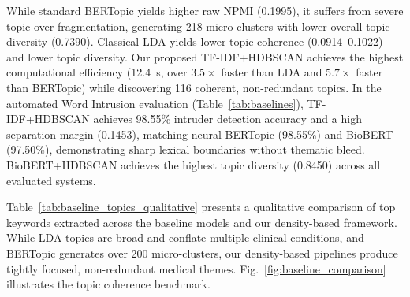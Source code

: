 \documentclass[a4paper,10pt,conference]{IEEEtran}
\begin{document}
While standard BERTopic yields higher raw NPMI (0.1995), it suffers from severe topic over-fragmentation, generating 218 micro-clusters with lower overall topic diversity (0.7390). Classical LDA yields lower topic coherence (0.0914--0.1022) and lower topic diversity. Our proposed TF-IDF+HDBSCAN achieves the highest computational efficiency (12.4~s, over $3.5\times$ faster than LDA and $5.7\times$ faster than BERTopic) while discovering 116 coherent, non-redundant topics. In the automated Word Intrusion evaluation (Table~\ref{tab:baselines}), TF-IDF+HDBSCAN achieves 98.55\% intruder detection accuracy and a high separation margin (0.1453), matching neural BERTopic (98.55\%) and BioBERT (97.50\%), demonstrating sharp lexical boundaries without thematic bleed. BioBERT+HDBSCAN achieves the highest topic diversity (0.8450) across all evaluated systems.

\begin{table}[t]
\centering
\caption{Qualitative topic comparison: representative extracted top keywords across baseline models and the proposed density-based framework.}
\label{tab:baseline_topics_qualitative}
\end{table}

Table~\ref{tab:baseline_topics_qualitative} presents a qualitative comparison of top keywords extracted across the baseline models and our density-based framework. While LDA topics are broad and conflate multiple clinical conditions, and BERTopic generates over 200 micro-clusters, our density-based pipelines produce tightly focused, non-redundant medical themes. Fig.~\ref{fig:baseline_comparison} illustrates the topic coherence benchmark.
\end{document}
